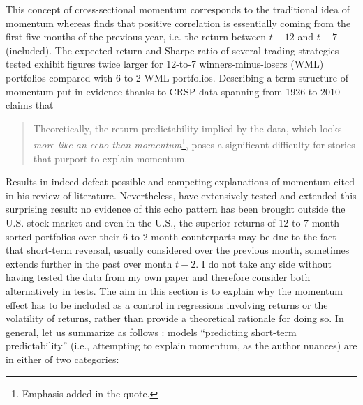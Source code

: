 This concept of cross-sectional momentum corresponds to the traditional idea of momentum whereas \cite{Novy-Marx2012} finds that positive correlation is essentially coming from the first five months of the previous year, i.e. the return between $t-12$ and $t-7$ (included). The expected return and Sharpe ratio of several trading strategies tested exhibit figures twice larger for 12-to-7 winners-minus-losers (WML) portfolios compared with 6-to-2 WML portfolios. Describing a term structure of momentum put in evidence thanks to CRSP data spanning from 1926 to 2010 \cite{Novy-Marx2012} claims that
\begin{quotation}
Theoretically, the return predictability implied by the data, which looks \emph{more like an echo than momentum}\footnote{Emphasis added in the quote.}, poses a significant difficulty for stories that purport to explain momentum.
\end{quotation}
Results in \cite{Novy-Marx2012} indeed defeat possible and competing explanations of momentum cited in his review of literature. Nevertheless, \cite{Goyal2015} have extensively tested and extended this surprising result: no evidence of this echo pattern has been brought outside the U.S. stock market and even in the U.S., the superior returns of 12-to-7-month sorted portfolios over their 6-to-2-month counterparts may be due to the fact that short-term reversal, usually considered over the previous month, sometimes extends further in the past over month $t-2$. I do not take any side without having tested the data from my own paper and therefore consider both alternatively in tests. The aim in this section is to explain why the momentum effect has to be included as a control in regressions involving returns or the volatility of returns, rather than provide a theoretical rationale for doing so. In general, let us summarize as follows : models ``predicting short-term predictability'' (i.e., attempting to explain momentum, as the author nuances) are in either of two categories:
